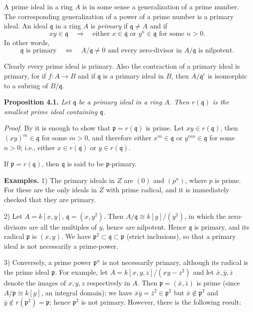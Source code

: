 A prime ideal in a ring \(A\) is in some sense a generalization of a prime number. The corresponding generalization of a power of a prime number is a primary ideal. An ideal \(\mathfrak q\) in a ring \(A\) is \emph{primary} if \(\mathfrak q\neq A\) and if
\[
xy\in\mathfrak q\quad\Longrightarrow\quad\text{either }x\in\mathfrak q\text{ or }y^n\in\mathfrak q\text{ for some }n>0.
\]
In other words,
\[
\mathfrak q\text{ is primary}\quad\Longleftrightarrow\quad A/\mathfrak q\neq0\text{ and every zero-divisor in }A/\mathfrak q\text{ is nilpotent}.
\]

Clearly every prime ideal is primary. Also the contraction of a primary ideal is primary, for if \(f:A\to B\) and if \(\mathfrak q\) is a primary ideal in \(B\), then \(A/\mathfrak q^c\) is isomorphic to a subring of \(B/\mathfrak q\).

\noindent\textbf{Proposition 4.1.} \emph{Let \(\mathfrak q\) be a primary ideal in a ring \(A\). Then \(r(\mathfrak q)\) is the smallest prime ideal containing \(\mathfrak q\).}

\noindent\emph{Proof.} By  it is enough to show that \(\mathfrak p=r(\mathfrak q)\) is prime. Let \(xy\in r(\mathfrak q)\), then \((xy)^m\in\mathfrak q\) for some \(m>0\), and therefore either \(x^m\in\mathfrak q\) or \(y^{mn}\in\mathfrak q\) for some \(n>0\); i.e., either \(x\in r(\mathfrak q)\) or \(y\in r(\mathfrak q)\). \proofbox

If \(\mathfrak p=r(\mathfrak q)\), then \(\mathfrak q\) is said to be \(\mathfrak p\)-primary.

\noindent\textbf{Examples.} 1) The primary ideals in \(Z\) are \((0)\) and \((p^n)\), where \(p\) is prime. For these are the only ideals in \(Z\) with prime radical, and it is immediately checked that they are primary.

2) Let \(A=k[x,y]\), \(\mathfrak q=(x,y^2)\). Then \(A/\mathfrak q\cong k[y]/(y^2)\), in which the zero-divisors are all the multiples of \(y\), hence are nilpotent. Hence \(\mathfrak q\) is primary, and its radical \(\mathfrak p\) is \((x,y)\). We have \(\mathfrak p^2\subset\mathfrak q\subset\mathfrak p\) (strict inclusions), so that a primary ideal is not necessarily a prime-power.

3) Conversely, a prime power \(\mathfrak p^n\) is not necessarily primary, although its radical is the prime ideal \(\mathfrak p\). For example, let \(A=k[x,y,z]/(xy-z^2)\) and let \(\bar x,\bar y,\bar z\) denote the images of \(x,y,z\) respectively in \(A\). Then \(\mathfrak p=(\bar x,\bar z)\) is prime (since \(A/\mathfrak p\cong k[y]\), an integral domain); we have \(\bar x\bar y=\bar z^2\in\mathfrak p^2\) but \(\bar x\notin\mathfrak p^2\) and \(\bar y\notin r(\mathfrak p^2)=\mathfrak p\); hence \(\mathfrak p^2\) is not primary. However, there is the following result:

